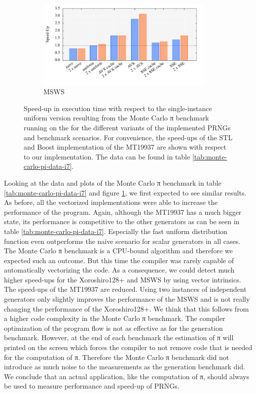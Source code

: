 \documentclass{stdlocal}
\begin{document}
\begin{figure}
      \begin{subfigure}[b]{\textwidth}
        \center
        \includegraphics[width=0.95\textwidth]{plots/monte_carlo_pi_desktop_msws.pdf}
        \caption{MSWS}
      \end{subfigure}
      \caption[Monte Carlo π Benchmark Speed-Up for ]{%
        Speed-up in execution time with respect to the single-instance uniform version resulting from the Monte Carlo π benchmark running on the  for the different variants of the implemented PRNGs and benchmark scenarios.
        For convenience, the speed-ups of the STL and Boost implementation of the MT19937 are shown with respect to our implementation.
        The data can be found in table \ref{tab:monte-carlo-pi-data-i7}.
      }
      \label{fig:monte-carlo-pi-speedup-i7}
    \end{figure}

    Looking at the data and plots of the Monte Carlo π benchmark in table \ref{tab:monte-carlo-pi-data-i7} and figure \ref{fig:monte-carlo-pi-speedup-i7}, we first expected to see similar results.
    As before, all the vectorized implementations were able to increase the performance of the program.
    Again, although the MT19937 has a much bigger state, its performance is competitive to the other generators as can be seen in table \ref{tab:monte-carlo-pi-data-i7}.
    Especially the fast uniform distribution function even outperforms the naive scenario for scalar generators in all cases.
    The Monte Carlo π benchmark is a CPU-bound algorithm and therefore we expected such an outcome.
    But this time the compiler was rarely capable of automatically vectorizing the code.
    As a consequence, we could detect much higher speed-ups for the Xoroshiro128+ and MSWS by using vector intrinsics.
    The speed-ups of the MT19937 are reduced.
    Using two instances of independent generators only slightly improves the performance of the MSWS and is not really changing the performance of the Xoroshiro128+.
    We think that this follows from a higher code complexity in the Monte Carlo π benchmark.
    The compiler optimization of the program flow is not as effective as for the generation benchmark.
    However, at the end of each benchmark the estimation of π will printed on the screen which forces the compiler to not remove code that is needed for the computation of π.
    Therefore the Monte Carlo π benchmark did not introduce as much noise to the measurements as the generation benchmark did.
    We conclude that an actual application, like the computation of π, should always be used to measure performance and speed-up of PRNGs.
\end{document}
